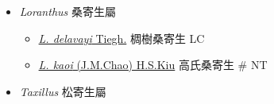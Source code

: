 
  \begin{itemize}
 \item[] \textit{Loranthus} 桑寄生屬
                                
  \begin{itemize}
        \item[] \href{http://www.theplantlist.org/tpl1.1/search?q=Loranthus+delavayi}{\textit{L. delavayi} Tiegh.}   椆樹桑寄生   LC
        \item[] \href{http://www.theplantlist.org/tpl1.1/search?q=Loranthus+kaoi}{\textit{L. kaoi} (J.M.Chao) H.S.Kiu}   高氏桑寄生  \# NT
  \end{itemize}
 \item[] \textit{Taxillus} 松寄生屬
                                

\end{itemize}

